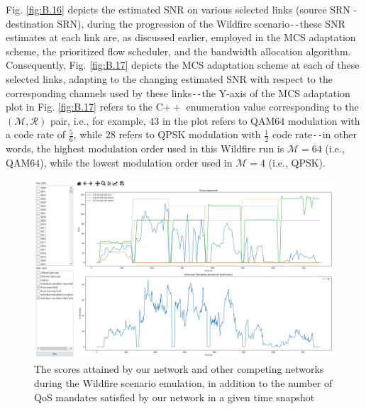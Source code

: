 Fig. \ref{fig:B.16} depicts the estimated SNR on various selected links (source SRN - destination SRN), during the progression of the Wildfire scenario\texttt{-{}-}these SNR estimates at each link are, as discussed earlier, employed in the MCS adaptation scheme, the prioritized flow scheduler, and the bandwidth allocation algorithm. Consequently, Fig. \ref{fig:B.17} depicts the MCS adaptation scheme at each of these selected links, adapting to the changing estimated SNR with respect to the corresponding channels used by these links\texttt{-{}-}the Y-axis of the MCS adaptation plot in Fig. \ref{fig:B.17} refers to the C${++}$ enumeration value corresponding to the $(\mathcal{M},\mathcal{R})$ pair, i.e., for example, $43$ in the plot refers to QAM$64$ modulation with a code rate of $\frac{5}{6}$, while $28$ refers to QPSK modulation with $\frac{1}{2}$ code rate\texttt{-{}-}in other words, the highest modulation order used in this Wildfire run is $\mathcal{M}{=}64$ (i.e., QAM$64$), while the lowest modulation order used in $\mathcal{M}{=}4$ (i.e., QPSK).
\begin{figure} [htb]
    \centerline{
    \includegraphics[width = 1.0\textwidth]{Wildfire_Scoring.PNG}}
    \caption{The scores attained by our network and other competing networks during the Wildfire scenario emulation, in addition to the number of QoS mandates satisfied by our network in a given time snapshot}
    \label{fig:B.18}
\end{figure}

